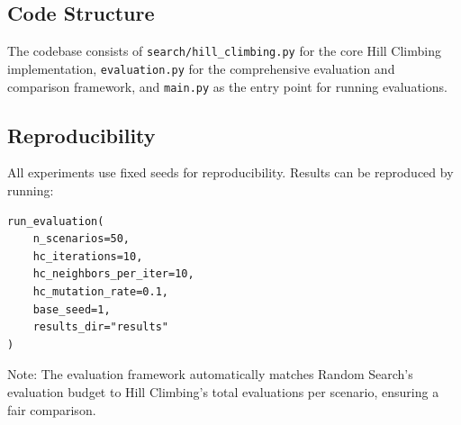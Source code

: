 \documentclass[11pt,a4paper]{article}
\begin{document}
\subsection*{Code Structure}

The codebase consists of \texttt{search/hill\_climbing.py} for the core Hill Climbing implementation, \texttt{evaluation.py} for the comprehensive evaluation and comparison framework, and \texttt{main.py} as the entry point for running evaluations.

\subsection*{Reproducibility}

All experiments use fixed seeds for reproducibility. Results can be reproduced by running:

\begin{lstlisting}
run_evaluation(
    n_scenarios=50,
    hc_iterations=10,
    hc_neighbors_per_iter=10,
    hc_mutation_rate=0.1,
    base_seed=1,
    results_dir="results"
)
\end{lstlisting}

Note: The evaluation framework automatically matches Random Search's evaluation budget to Hill Climbing's total evaluations per scenario, ensuring a fair comparison.
\end{document}
